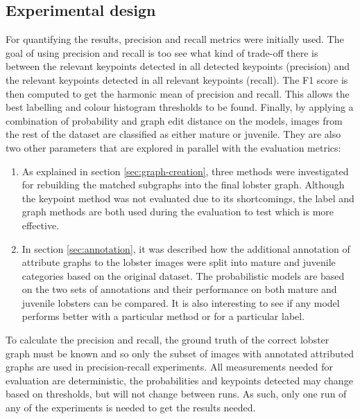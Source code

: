 \subsection{Experimental design}
For quantifying the results, precision and recall metrics were initially used. The goal of using precision and recall is too see what kind of trade-off there is between the relevant keypoints detected in all detected keypoints (precision) and the relevant keypoints detected in all relevant keypoints (recall). The F1 score is then computed to get the harmonic mean of precision and recall. This allows the best labelling and colour histogram thresholds to be found. Finally, by applying a combination of probability and graph edit distance on the models, images from the rest of the dataset are classified as either mature or juvenile.
\n
They are also two other parameters that are explored in parallel with the evaluation metrics:
\begin{enumerate}
\item As explained in section \ref{sec:graph-creation}, three methods were investigated for rebuilding the matched subgraphs into the final lobster graph. Although the keypoint method was not evaluated due to its shortcomings, the label and graph methods are both used during the evaluation to test which is more effective.
\item In section \ref{sec:annotation}, it was described how the additional annotation of attribute graphs to the lobster images were split into mature and juvenile categories based on the original dataset. The probabilistic models are based on the two sets of annotations and their performance on both mature and juvenile lobsters can be compared. It is also interesting to see if any model performs better with a particular method or for a particular label. 
\end{enumerate}
To calculate the precision and recall, the ground truth of the correct lobster graph must be known and so only the subset of images with annotated attributed graphs are used in precision-recall experiments. 
\n
All measurements needed for evaluation are deterministic, the probabilities and keypoints detected may change based on thresholds, but will not change between runs. As such, only one run of any of the experiments is needed to get the results needed.

